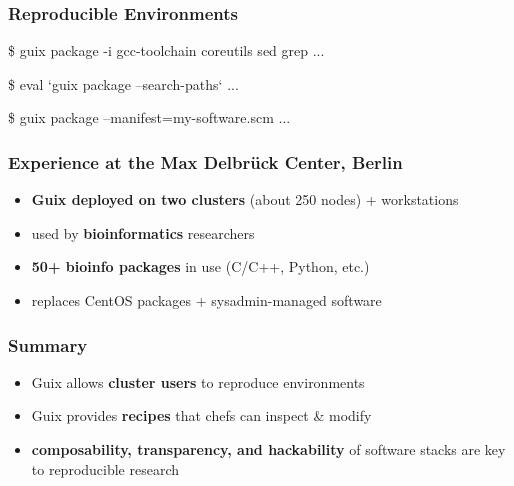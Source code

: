 \documentclass{beamer}
\begin{document}
\begin{frame}[fragile]
  \frametitle{Reproducible Environments}

  \begin{semiverbatim}
\$ guix package -i gcc-toolchain coreutils sed grep
\textrm{...}


\$ eval `guix package --search-paths`
\textrm{...}


\$ guix package --manifest=my-software.scm
\textrm{...}
  \end{semiverbatim}

\end{frame}

\begin{frame}
  \frametitle{Experience at the Max Delbrück Center, Berlin}

  \large{
  \begin{itemize}
    \item \textbf{Guix deployed on two clusters} (about 250 nodes) + workstations
    \item used by \textbf{bioinformatics} researchers
    \item \textbf{50+ bioinfo packages} in use (C/C++, Python,
      etc.)
    \item replaces CentOS packages + sysadmin-managed software
  \end{itemize}
  }
\end{frame}


\begin{frame}
  \frametitle{Summary}

  \Large{
    \begin{itemize}
    \item<1-> Guix allows \alert{\textbf{cluster users}} to reproduce
      environments
    \item<2-> Guix provides \alert{\textbf{recipes}} that chefs can
      inspect \& modify
    \item<3-> \alert{\textbf{composability, transparency, and
        hackability}} of software stacks are key to reproducible
      research
    \end{itemize}
  }
\end{frame}
\end{document}
